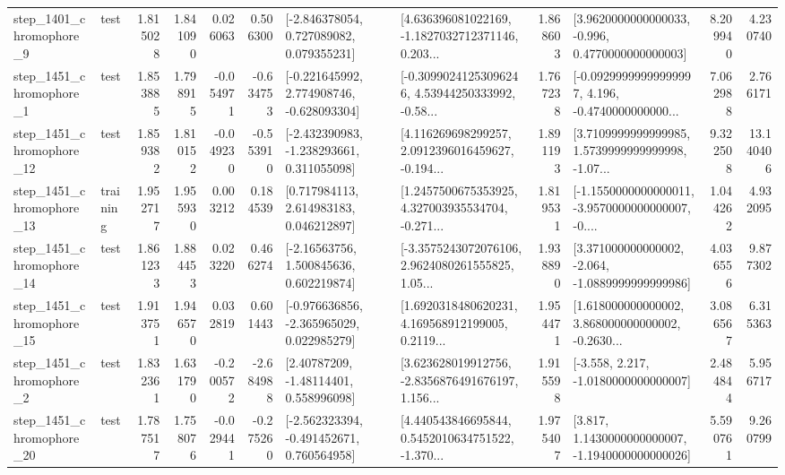 \begin{tabular}{llrrrrllrlrr}
  step\_1401\_chromophore\_9 &      test &      1.815028 &    1.841090 &      0.026063 &  0.506300 &    [-2.846378054, 0.727089082, 0.079355231] &  [4.636396081022169, -1.1827032712371146, 0.203... &       1.868603 &   [3.9620000000000033, -0.996, 0.4770000000000003] &            8.209940 &          4.230740 \\
  step\_1451\_chromophore\_1 &      test &      1.853885 &    1.798915 &     -0.054971 & -0.634753 &   [-0.221645992, 2.774908746, -0.628093304] &  [-0.30990241253096246, 4.53944250333992, -0.58... &       1.767238 &  [-0.09299999999999997, 4.196, -0.4740000000000... &            7.062988 &          2.766171 \\
 step\_1451\_chromophore\_12 &      test &      1.859382 &    1.810152 &     -0.049230 & -0.553910 &   [-2.432390983, -1.238293661, 0.311055098] &  [4.116269698299257, 2.0912396016459627, -0.194... &       1.891193 &  [3.7109999999999985, 1.5739999999999998, -1.07... &            9.322508 &         13.140406 \\
 step\_1451\_chromophore\_13 &  training &      1.952717 &    1.955930 &      0.003212 &  0.184539 &     [0.717984113, 2.614983183, 0.046212897] &  [1.2457500675353925, 4.327003935534704, -0.271... &       1.819531 &  [-1.1550000000000011, -3.9570000000000007, -0.... &            1.044262 &          4.932095 \\
 step\_1451\_chromophore\_14 &      test &      1.861233 &    1.884453 &      0.023220 &  0.466274 &     [-2.16563756, 1.500845636, 0.602219874] &  [-3.3575243072076106, 2.9624080261555825, 1.05... &       1.938890 &   [3.371000000000002, -2.064, -1.0889999999999986] &            4.036556 &          9.877302 \\
 step\_1451\_chromophore\_15 &      test &      1.913751 &    1.946570 &      0.032819 &  0.601443 &   [-0.976636856, -2.365965029, 0.022985279] &  [1.6920318480620231, 4.169568912199005, 0.2119... &       1.954471 &  [1.618000000000002, 3.868000000000002, -0.2630... &            3.086567 &          6.315363 \\
  step\_1451\_chromophore\_2 &      test &      1.832361 &    1.631790 &     -0.200572 & -2.684988 &      [2.40787209, -1.48114401, 0.558996098] &  [3.623628019912756, -2.8356876491676197, 1.156... &       1.915598 &               [-3.558, 2.217, -1.0180000000000007] &            2.484844 &          5.956717 \\
 step\_1451\_chromophore\_20 &      test &      1.787517 &    1.758076 &     -0.029441 & -0.275260 &   [-2.562323394, -0.491452671, 0.760564958] &  [4.440543846695844, 0.5452010634751522, -1.370... &       1.975407 &   [3.817, 1.1430000000000007, -1.1940000000000026] &            5.590761 &          9.260799 \\

\end{tabular}
